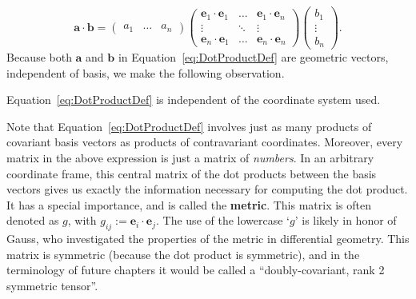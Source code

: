 \documentclass[../master.tex]{subfiles}
\begin{document}
	\begin{equation}\label{eq:DotProductDef}
		\mathbf a \cdot \mathbf b = \begin{pmatrix}
			a_1 &
			\dots &
			a_n
		\end{pmatrix}
		\begin{pmatrix}
			\mathbf e_1 \cdot \mathbf e_1 & \dots & \mathbf e_1 \cdot \mathbf e_n\\
			\vdots & \ddots & \vdots\\
			\mathbf e_n \cdot \mathbf e_1 & \dots & \mathbf e_n \cdot \mathbf e_n
		\end{pmatrix}
		\begin{pmatrix}
			b_1\\
			\vdots\\
			b_n
		\end{pmatrix}.
	\end{equation}
	Because both $\mathbf a$ and $\mathbf b$ in Equation~\eqref{eq:DotProductDef} are geometric vectors, independent of basis, we make the following observation.
	\begin{obs}
		Equation~\eqref{eq:DotProductDef} is independent of the coordinate system used.
	\end{obs}

	Note that Equation~\eqref{eq:DotProductDef} involves just as many products of covariant basis vectors as products of contravariant coordinates. Moreover, every matrix in the above expression is just a matrix of \emph{numbers}. In an arbitrary coordinate frame, this central matrix of the dot products between the basis vectors gives us exactly the information necessary for computing the dot product. It has a special importance, and is called the \textbf{metric}. This matrix is often denoted as $g$, with $g_{ij} := \mathbf e_i \cdot \mathbf e_j$. The use of the lowercase `$g$' is likely in honor of Gauss, who investigated the properties of the metric in differential geometry. 
	 This matrix is symmetric (because the dot product is symmetric), and in the terminology of future chapters it would be called a ``doubly-covariant, rank 2 symmetric tensor''. 
	
\end{document}
